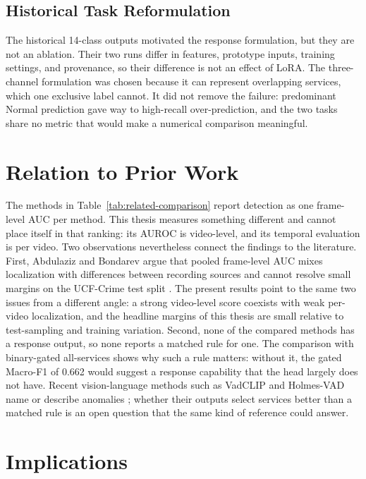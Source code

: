 \subsection{Historical Task Reformulation}
\label{sec:discussion-historical}

The historical 14-class outputs motivated the response formulation, but they
are not an ablation. Their two runs differ in features, prototype inputs,
training settings, and provenance, so their difference is not an effect of
LoRA. The three-channel formulation was chosen because it can represent
overlapping services, which one exclusive label cannot. It did not remove the
failure: predominant Normal prediction gave way to high-recall over-prediction,
and the two tasks share no metric that would make a numerical comparison
meaningful.

\section{Relation to Prior Work}
\label{sec:discussion-prior-work}

The methods in Table~\ref{tab:related-comparison} report detection as one
frame-level AUC per method. This thesis measures something different and cannot
place itself in that ranking: its AUROC is video-level, and its temporal
evaluation is per video. Two observations nevertheless connect the findings to
the literature. First, Abdulaziz and Bondarev argue that pooled frame-level AUC
mixes localization with differences between recording sources and cannot
resolve small margins on the UCF-Crime test split \cite{abdulaziz2026auditing}.
The present results point to the same two issues from a different angle: a
strong video-level score coexists with weak per-video localization, and the
headline margins of this thesis are small relative to test-sampling and
training variation. Second, none of the compared methods has a response output,
so none reports a matched rule for one. The comparison with binary-gated all-services shows
why such a rule matters: without it, the gated Macro-F1 of 0.662 would suggest
a response capability that the head largely does not have. Recent
vision-language methods such as VadCLIP and Holmes-VAD name or describe
anomalies \cite{wu2024vadclip,zhang2024holmes}; whether their outputs select
services better than a matched rule is an open question that the same kind of
reference could answer.

\section{Implications}
\label{sec:discussion-implications}

